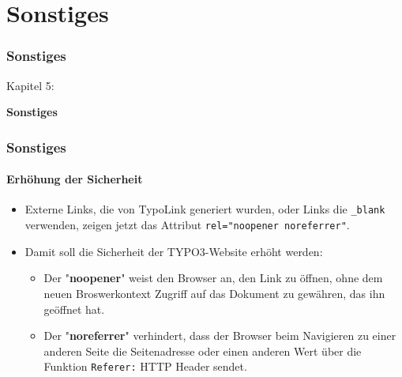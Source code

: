 %

\section{Sonstiges}
\begin{frame}[fragile]
	\frametitle{Sonstiges}

	\begin{center}\huge{Kapitel 5:}\end{center}
	\begin{center}\huge{\color{typo3darkgrey}\textbf{Sonstiges}}\end{center}

\end{frame}


\begin{frame}[fragile]
	\frametitle{Sonstiges}
	\framesubtitle{Erhöhung der Sicherheit}

	\begin{itemize}
		\item Externe Links, die von TypoLink generiert wurden, oder Links die \texttt{\_blank} verwenden,
			zeigen jetzt das Attribut \texttt{rel="noopener noreferrer"}.
		\item Damit soll die Sicherheit der TYPO3-Website erhöht werden:

			\begin{itemize}
				\item Der "\textbf{noopener}" weist den Browser an, den Link zu öffnen, ohne dem neuen
					Broswerkontext Zugriff auf das Dokument zu gewähren, das ihn geöffnet hat.
				\item Der "\textbf{noreferrer}" verhindert, dass der Browser beim Navigieren zu einer
					anderen Seite die Seitenadresse oder einen anderen Wert über die Funktion
					\texttt{Referer:} HTTP Header sendet.
			\end{itemize}

	\end{itemize}

\end{frame}

